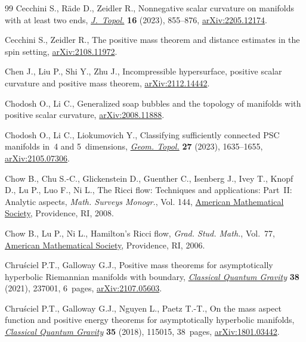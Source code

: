 \begin{thebibliography}{99}
Cecchini S., R\"ade D., Zeidler R., Nonnegative scalar curvature on manifolds
  with at least two ends, \href{https://doi.org/10.1112/topo.12303}{\textit{J.~Topol.}} \textbf{16} (2023), 855--876,
  \href{https://arxiv.org/abs/2205.12174}{arXiv:2205.12174}.

Cecchini S., Zeidler R., The positive mass theorem and distance estimates in
  the spin setting, \href{https://arxiv.org/abs/2108.11972}{arXiv:2108.11972}.

Chen J., Liu P., Shi Y., Zhu J., Incompressible hypersurface, positive scalar
  curvature and positive mass theorem, \href{https://arxiv.org/abs/2112.14442}{arXiv:2112.14442}.

Chodosh O., Li C., Generalized soap bubbles and the topology of manifolds with
  positive scalar curvature, \href{https://arxiv.org/abs/2008.11888}{arXiv:2008.11888}.

Chodosh O., Li C., Liokumovich Y., Classifying sufficiently connected {PSC}
  manifolds in~4 and 5~dimensions, \href{https://doi.org/10.2140/gt.2023.27.1635}{\textit{Geom. Topol.}} \textbf{27} (2023),
  1635--1655, \href{https://arxiv.org/abs/2105.07306}{arXiv:2105.07306}.

Chow B., Chu S.-C., Glickenstein D., Guenther C., Isenberg J., Ivey T., Knopf
  D., Lu P., Luo F., Ni L., The {R}icci flow: {T}echniques and applications:
  {P}art~{II}: {A}nalytic aspects, \textit{Math. Surveys Monogr.}, Vol. 144,
  \href{https://doi.org/10.1090/surv/144}{American Mathematical Society}, Providence, RI, 2008.

Chow B., Lu P., Ni L., Hamilton's {R}icci flow, \textit{Grad. Stud. Math.},
  Vol.~77, \href{https://doi.org/10.1090/gsm/077}{American Mathematical Society}, Providence, RI, 2006.

Chru\'sciel P.T., Galloway G.J., Positive mass theorems for asymptotically
  hyperbolic {R}iemannian manifolds with boundary, \href{https://doi.org/10.1088/1361-6382/ac1fd1}{\textit{Classical Quantum
  Gravity}} \textbf{38} (2021), 237001, 6~pages, \href{https://arxiv.org/abs/2107.05603}{arXiv:2107.05603}.

Chru\'sciel P.T., Galloway G.J., Nguyen L., Paetz T.-T., On the mass aspect
  function and positive energy theorems for asymptotically hyperbolic
  manifolds, \href{https://doi.org/10.1088/1361-6382/aabed1}{\textit{Classical Quantum Gravity}} \textbf{35} (2018), 115015,
  38~pages, \href{https://arxiv.org/abs/1801.03442}{arXiv:1801.03442}.


\end{thebibliography}
